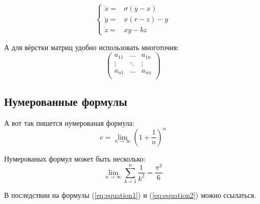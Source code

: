 $$
\left\{
  \begin{array}{rl}
    \dot x = & \sigma (y-x) \\
    \dot y = & x (r - z) - y \\
    \dot z = & xy - bz
  \end{array}
\right.
$$

А для вёрстки матриц удобно использовать многоточия:
$$
\left(
  \begin{array}{ccc}
  	a_{11} & \ldots & a_{1n} \\
  	\vdots & \ddots & \vdots \\
  	a_{n1} & \ldots & a_{nn} \\
  \end{array}
\right)
$$


\subsection{Нумерованные формулы} \label{subsect1_3_3}

А вот так пишется нумерованая формула:
\begin{equation}
  \label{eq:equation1}
  e = \lim_{n \to \infty} \left( 1+\frac{1}{n} \right) ^n
\end{equation}

Нумерованых формул может быть несколько:
\begin{equation}
  \label{eq:equation2}
  \lim_{n \to \infty} \sum_{k=1}^n \frac{1}{k^2} = \frac{\pi^2}{6}
\end{equation}

В последствии на формулы (\ref{eq:equation1}) и (\ref{eq:equation2}) можно ссылаться.


\clearpage
